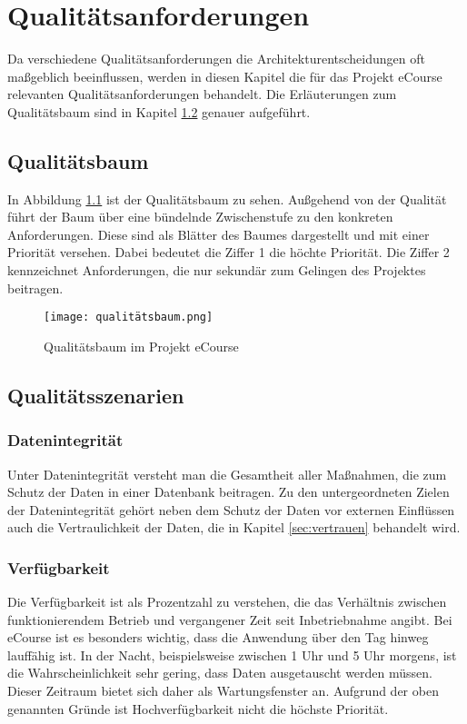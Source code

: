 \chapter{Qualitätsanforderungen}
Da verschiedene Qualitätsanforderungen die Architekturentscheidungen oft maßgeblich beeinflussen, werden in diesen Kapitel die für das Projekt eCourse relevanten Qualitätsanforderungen behandelt. Die Erläuterungen zum Qualitätsbaum sind in Kapitel \ref{sec:q2} genauer aufgeführt.

\section{Qualitätsbaum}
In Abbildung \ref{fib:baum} ist der Qualitätsbaum zu sehen. Außgehend von der Qualität führt der Baum über eine bündelnde Zwischenstufe zu den konkreten Anforderungen. Diese sind als Blätter des Baumes dargestellt und mit einer Priorität versehen. Dabei bedeutet die Ziffer 1 die höchte Priorität. Die Ziffer 2 kennzeichnet Anforderungen, die nur sekundär zum Gelingen des Projektes beitragen.

\begin{figure}[H]
\centering
\texttt{[image: qualitätsbaum.png]}
\caption{Qualitätsbaum im Projekt eCourse}
\label{fib:baum}
\end{figure}


\section{Qualitätsszenarien}
\label{sec:q2}
\subsection{Datenintegrität}
Unter Datenintegrität versteht man die Gesamtheit aller Maßnahmen, die zum Schutz der Daten in einer Datenbank beitragen. Zu den untergeordneten Zielen der Datenintegrität gehört neben dem Schutz der Daten vor externen Einflüssen auch die Vertraulichkeit der Daten, die in Kapitel \ref{sec:vertrauen} behandelt wird.

\subsection{Verfügbarkeit}
Die Verfügbarkeit ist als Prozentzahl zu verstehen, die das Verhältnis zwischen funktionierendem Betrieb und vergangener Zeit seit Inbetriebnahme angibt. Bei eCourse ist es besonders wichtig, dass die Anwendung über den Tag hinweg lauffähig ist. In der Nacht, beispielsweise zwischen 1 Uhr und 5 Uhr morgens, ist die Wahrscheinlichkeit sehr gering, dass Daten ausgetauscht werden müssen. Dieser Zeitraum bietet sich daher als Wartungsfenster an. Aufgrund der oben genannten Gründe ist Hochverfügbarkeit nicht die höchste Priorität.

